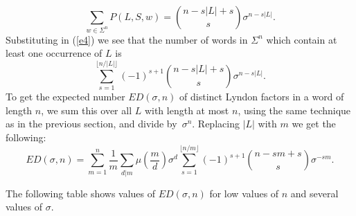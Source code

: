 \documentclass[11pt]{amsart}
\newcommand{\1}{\bar{1}}
\theoremstyle{plain}
\theoremstyle{definition}
\theoremstyle{remark}
\begin{document}
\begin{equation*}\label{e5}
\sum_{w \in \Sigma^n} P(L,S,w) = {{n-s|L|+s} \choose {s}} \sigma^{n-s|L|}.
\end{equation*}
Substituting in (\ref{e4}) we see that the number of words in $\Sigma^n$ which contain at least one occurrence of $L$ is
$$\sum_{s=1}^{\lfloor n/|L|\rfloor}  (-1)^{s+1} {{n-s|L|+s} \choose s} \sigma^{n-s|L|}.$$
To get the expected number $ED(\sigma,n)$ of distinct Lyndon factors in a word of length $n$,
we sum this over all $L$ with length at most $n$,
using the same technique as in the previous section,
and divide by~$\sigma^n$.
Replacing $|L|$ with $m$ we get the following:
\begin{equation}\label{e6}
ED(\sigma,n) = \sum_{m=1}^n \frac{1}{m}\sum_{d | m} \mu\left(\frac{m}{d}\right) \sigma^d \sum_{s=1}^{\lfloor n/m\rfloor}  (-1)^{s+1} {n-sm+s \choose s} \sigma^{-sm}.
\end{equation}

The following table shows values of $ED(\sigma,n)$ for low values of $n$ and several values of $\sigma$.
\end{document}

